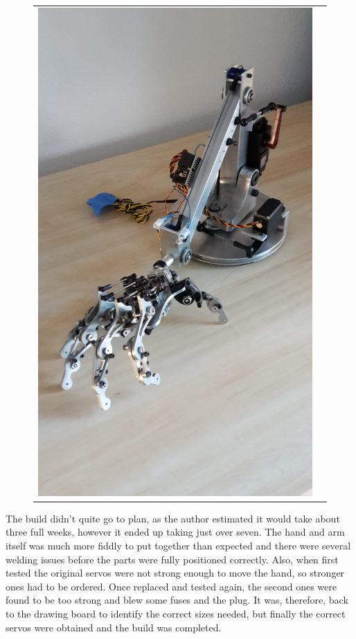 \documentclass[progress]{cmpreport}
\begin{document}
\begin{figure}[H]
\begin{tabular}{ll}
		\includegraphics[trim=2cm 2cm 3cm 4cm, clip=true, totalheight=0.15\textheight, angle=-90]{photos/Day 42-pt5.jpg}
	\end{tabular}
\end{figure}

The build didn't quite go to plan, as the author estimated it would take about three full weeks, however it ended up taking just over seven. The hand and arm itself was much more fiddly to put together than expected and there were several welding issues before the parts were fully positioned correctly. Also, when first tested the original servos were not strong enough to move the hand, so stronger ones had to be ordered. Once replaced and tested again, the second ones were found to be too strong and blew some fuses and the plug. It was, therefore, back to the drawing board to identify the correct sizes needed, but finally the correct servos were obtained and the build was completed.
\end{document}

